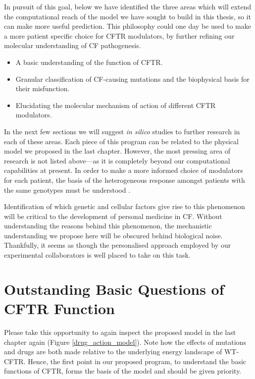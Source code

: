In pursuit of this goal, below we have identified the three areas which will extend the computational reach of the model we have sought to build in this thesis, so it can make more useful prediction. This philosophy could one day be used to make a more patient specific choice for CFTR modulators, by further refining our molecular understanding of CF pathogenesis.

\begin{itemize}
	\item A basic understanding of the function of CFTR.
	\item Granular classification of CF-causing mutations and the biophysical basis for their misfunction.
	\item Elucidating the molecular mechanism of action of different CFTR modulators. 
\end{itemize}

In the next few sections we will suggest \textit{in silico} studies to further research in each of these areas. Each piece of this program can be related to the physical model we proposed in the last chapter. However, the most pressing area of research is not listed above---as it is completely beyond our computational capabilities at present. In order to make a more informed choice of modulators for each patient, the basis of the heterogeneous response amongst patients with the same genotypes must be understood \cite{hanafin2021}. 

Identification of which genetic and cellular factors give rise to this phenomenon will be critical to the development of personal medicine in CF. Without understanding the reasons behind this phenomenon, the mechanistic understanding we propose here will be obscured behind biological noise. Thankfully, it seems as though the personalised approach employed by our experimental collaborators is well placed to take on this task.

\section{Outstanding Basic Questions of CFTR Function}

Please take this opportunity to again inspect the proposed model in the last chapter again (Figure \ref{drug_action_model}). Note how the effects of mutations and drugs are both made relative to the underlying energy landscape of WT-CFTR. Hence, the first point in our proposed program, to understand the basic functions of CFTR, forms the basis of the model and should be given priority.

